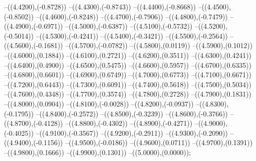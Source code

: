 {	--({\sx*(4.4200)},{\sy*(-0.8728)})
	--({\sx*(4.4300)},{\sy*(-0.8743)})
	--({\sx*(4.4400)},{\sy*(-0.8668)})
	--({\sx*(4.4500)},{\sy*(-0.8502)})
	--({\sx*(4.4600)},{\sy*(-0.8248)})
	--({\sx*(4.4700)},{\sy*(-0.7906)})
	--({\sx*(4.4800)},{\sy*(-0.7479)})
	--({\sx*(4.4900)},{\sy*(-0.6971)})
	--({\sx*(4.5000)},{\sy*(-0.6387)})
	--({\sx*(4.5100)},{\sy*(-0.5732)})
	--({\sx*(4.5200)},{\sy*(-0.5014)})
	--({\sx*(4.5300)},{\sy*(-0.4241)})
	--({\sx*(4.5400)},{\sy*(-0.3421)})
	--({\sx*(4.5500)},{\sy*(-0.2564)})
	--({\sx*(4.5600)},{\sy*(-0.1681)})
	--({\sx*(4.5700)},{\sy*(-0.0782)})
	--({\sx*(4.5800)},{\sy*(0.0119)})
	--({\sx*(4.5900)},{\sy*(0.1012)})
	--({\sx*(4.6000)},{\sy*(0.1884)})
	--({\sx*(4.6100)},{\sy*(0.2721)})
	--({\sx*(4.6200)},{\sy*(0.3511)})
	--({\sx*(4.6300)},{\sy*(0.4241)})
	--({\sx*(4.6400)},{\sy*(0.4900)})
	--({\sx*(4.6500)},{\sy*(0.5475)})
	--({\sx*(4.6600)},{\sy*(0.5957)})
	--({\sx*(4.6700)},{\sy*(0.6335)})
	--({\sx*(4.6800)},{\sy*(0.6601)})
	--({\sx*(4.6900)},{\sy*(0.6749)})
	--({\sx*(4.7000)},{\sy*(0.6773)})
	--({\sx*(4.7100)},{\sy*(0.6671)})
	--({\sx*(4.7200)},{\sy*(0.6443)})
	--({\sx*(4.7300)},{\sy*(0.6091)})
	--({\sx*(4.7400)},{\sy*(0.5618)})
	--({\sx*(4.7500)},{\sy*(0.5034)})
	--({\sx*(4.7600)},{\sy*(0.4348)})
	--({\sx*(4.7700)},{\sy*(0.3574)})
	--({\sx*(4.7800)},{\sy*(0.2728)})
	--({\sx*(4.7900)},{\sy*(0.1831)})
	--({\sx*(4.8000)},{\sy*(0.0904)})
	--({\sx*(4.8100)},{\sy*(-0.0028)})
	--({\sx*(4.8200)},{\sy*(-0.0937)})
	--({\sx*(4.8300)},{\sy*(-0.1795)})
	--({\sx*(4.8400)},{\sy*(-0.2572)})
	--({\sx*(4.8500)},{\sy*(-0.3239)})
	--({\sx*(4.8600)},{\sy*(-0.3766)})
	--({\sx*(4.8700)},{\sy*(-0.4128)})
	--({\sx*(4.8800)},{\sy*(-0.4302)})
	--({\sx*(4.8900)},{\sy*(-0.4271)})
	--({\sx*(4.9000)},{\sy*(-0.4025)})
	--({\sx*(4.9100)},{\sy*(-0.3567)})
	--({\sx*(4.9200)},{\sy*(-0.2911)})
	--({\sx*(4.9300)},{\sy*(-0.2090)})
	--({\sx*(4.9400)},{\sy*(-0.1156)})
	--({\sx*(4.9500)},{\sy*(-0.0186)})
	--({\sx*(4.9600)},{\sy*(0.0711)})
	--({\sx*(4.9700)},{\sy*(0.1391)})
	--({\sx*(4.9800)},{\sy*(0.1666)})
	--({\sx*(4.9900)},{\sy*(0.1301)})
	--({\sx*(5.0000)},{\sy*(0.0000)});
}
